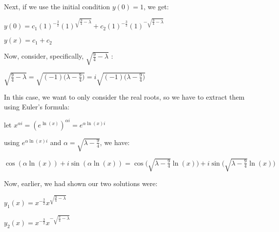\documentclass[executivepaper]{article}
\begin{document}
\begin{flushleft}
\begin{center}
\end{center}

Next, if we use the initial condition $y(0)=1$, we get:

\begin{center}

$y(0)=c_{1}(1)^{-\frac{3}{2}}(1)^{\sqrt{\frac{9}{4}-\lambda}}+c_{2}(1)^{-\frac{3}{2}}(1)^{-\sqrt{\frac{9}{4}-\lambda}}$

\hspace{1mm}

$y(x)=c_{1}+c_{2}$

\end{center}

Now, consider, specifically, $\sqrt{\frac{9}{4}-\lambda}$ \vspace{1mm} :

\begin{center}

$\sqrt{\frac{9}{4}-\lambda}=\sqrt{(-1)\bigg(\lambda - \frac{9}{4}\bigg)}=i\sqrt{(-1)\bigg(\lambda - \frac{9}{4}\bigg)}$

\end{center}

In this case, we want to only consider the real roots, so we have to extract them using Euler's formula:

\begin{center}

let $x^{\alpha i}=(e^{\ln(x)})^{\alpha i}=e^{\alpha \ln(x) i}$

\hspace{1mm}

using $e^{\alpha \ln(x) i}$ and $\alpha=\sqrt{\lambda-\frac{9}{4}}$, we have:

\hspace{1mm}

$\cos(\alpha \ln(x))+i\sin(\alpha \ln(x))=\cos\bigg(\sqrt{\lambda-\frac{9}{4}} \ln(x)\bigg)+i\sin\bigg(\sqrt{\lambda-\frac{9}{4}} \ln(x)\bigg)$

\end{center}

Now, earlier, we had shown our two solutions were:

\begin{center}

$y_{1}(x)=x^{-\frac{3}{2}}x^{\sqrt{\frac{9}{4}-\lambda}}$

\hspace{1mm}

$y_{2}(x)=x^{-\frac{3}{2}}x^{-\sqrt{\frac{9}{4}-\lambda}}$


\end{center}
\end{flushleft}
\end{document}
